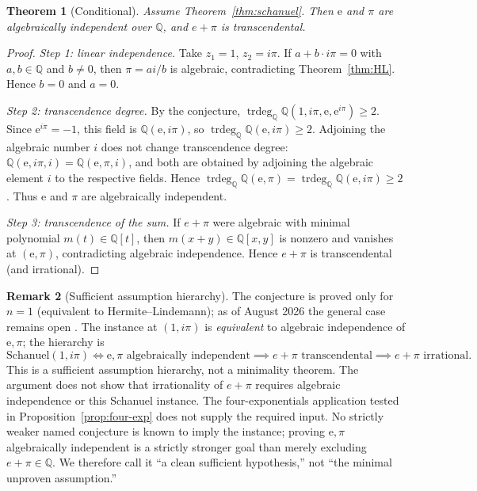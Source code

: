 \documentclass[11pt]{amsart}
\newtheorem{theorem}{Theorem}[section]
\theoremstyle{definition}
\newtheorem{remark}[theorem]{Remark}
\theoremstyle{remark}
\numberwithin{equation}{section}
\newcommand{\Q}{\mathbb{Q}}
\newcommand{\trdeg}{\operatorname{trdeg}}
\newcommand{\ee}{\mathrm{e}}
\begin{document}
\begin{theorem}[Conditional]\label{thm:schanuel-consequence}
Assume Theorem~\ref{thm:schanuel}. Then $\ee$ and $\pi$ are algebraically independent over $\Q$, and $e+\pi$ is transcendental.
\end{theorem}

\begin{proof}
\emph{Step 1: linear independence.} Take $z_1=1$, $z_2=i\pi$. If $a+b\cdot i\pi=0$ with $a,b\in\Q$ and $b\ne0$, then $\pi=ai/b$ is algebraic, contradicting Theorem~\ref{thm:HL}. Hence $b=0$ and $a=0$.

\emph{Step 2: transcendence degree.} By the conjecture, $\trdeg_\Q\Q(1,i\pi,\ee,\ee^{i\pi})\ge2$. Since $\ee^{i\pi}=-1$, this field is $\Q(\ee,i\pi)$, so $\trdeg_\Q\Q(\ee,i\pi)\ge2$. Adjoining the algebraic number $i$ does not change transcendence degree: $\Q(\ee,i\pi,i)=\Q(\ee,\pi,i)$, and both are obtained by adjoining the algebraic element $i$ to the respective fields. Hence $\trdeg_\Q\Q(\ee,\pi)=\trdeg_\Q\Q(\ee,i\pi)\ge2$. Thus $\ee$ and $\pi$ are algebraically independent.

\emph{Step 3: transcendence of the sum.} If $e+\pi$ were algebraic with minimal polynomial $m(t)\in\Q[t]$, then $m(x+y)\in\Q[x,y]$ is nonzero and vanishes at $(\ee,\pi)$, contradicting algebraic independence. Hence $e+\pi$ is transcendental (and irrational).
\end{proof}

\begin{remark}[Sufficient assumption hierarchy]
The conjecture is proved only for $n=1$ (equivalent to Hermite--Lindemann); as of August 2026 the general case remains open \cite{SchanuelWiki}. The instance at $(1,i\pi)$ is \emph{equivalent} to algebraic independence of $\ee,\pi$; the hierarchy is
\[
\text{Schanuel}(1,i\pi)\iff \ee,\pi\text{ algebraically independent}\implies e+\pi\text{ transcendental}\implies e+\pi\text{ irrational}.
\]
This is a sufficient assumption hierarchy, not a minimality theorem. The argument does not show that irrationality of $e+\pi$ requires algebraic independence or this Schanuel instance. The four-exponentials application tested in Proposition~\ref{prop:four-exp} does not supply the required input. No strictly weaker named conjecture is known to imply the instance; proving $\ee,\pi$ algebraically independent is a strictly stronger goal than merely excluding $e+\pi\in\Q$. We therefore call it ``a clean sufficient hypothesis,'' not ``the minimal unproven assumption.''
\end{remark}
\end{document}
